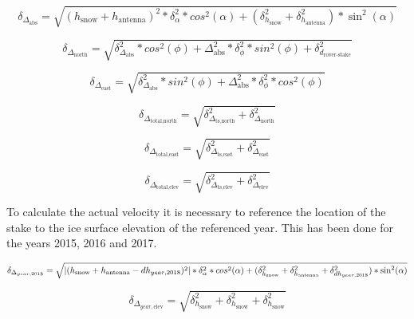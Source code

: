 
\begin{equation}
	\delta_{\Delta_{\text{abs}}} = \sqrt{(h_{\text{snow}} + h_{\text{antenna}})^2 * \delta_{\alpha}^2 * cos^2(\alpha) + (\delta_{h_{\text{snow}}}^2 + \delta_{h_{\text{antenna}}}^2) * \sin^2(\alpha)}
\end{equation}

\begin{equation}
	\delta_{\Delta_{\text{north}}} = \sqrt{\delta_{\Delta_{\text{abs}}}^2 * cos^2(\phi) + \Delta_{\text{abs}}^2 * \delta_{\phi}^2 * sin^2(\phi) + \delta_{d_{\text{rover-stake}}}^2}
\end{equation}

\begin{equation}
	\delta_{\Delta_{\text{east}}} = \sqrt{\delta_{\Delta_{\text{abs}}}^2 * sin^2(\phi) + \Delta_{\text{abs}}^2 * \delta_{\phi}^2 * cos^2(\phi)}
\end{equation}

\begin{equation}
	\delta_{\Delta_{\text{total,north}}} = \sqrt{\delta_{\Delta_{\text{ts,north}}}^2 + \delta_{\Delta_{\text{north}}}^2}
\end{equation}

\begin{equation}
	\delta_{\Delta_{\text{total,east}}} = \sqrt{\delta_{\Delta_{\text{ts,east}}}^2 + \delta_{\Delta_{\text{east}}}^2}
\end{equation}

\begin{equation}
	\delta_{\Delta_{\text{total,elev}}} = \sqrt{\delta_{\Delta_{\text{ts,elev}}}^2 +\delta_{\Delta_{\text{elev}}}^2}
\end{equation}

To calculate the actual velocity it is necessary to reference the location of the stake to the ice surface elevation of the referenced year. 
This has been done for the years 2015, 2016 and 2017.
 
\begin{equation}
\delta_{\Delta_{year,2018}} = \sqrt{\left|(h_{\text{snow}} + h_{\text{antenna}} - dh_{year,2018})^2\right| * \delta_{\alpha}^2 * cos^2(\alpha)\\
+ (\delta_{h_{\text{snow}}}^2 + \delta_{h_{\text{antenna}}}^2 + \delta_{dh_{year,2018}}^2) * \sin^2(\alpha)}
\end{equation}

\begin{equation}
	\delta_{\Delta_{year, \text{elev}}} = \sqrt{\delta_{h_{\text{snow}}}^2 + \delta_{h_{\text{snow}}}^2 + \delta_{h_{\text{snow}}}^2}
\end{equation}


